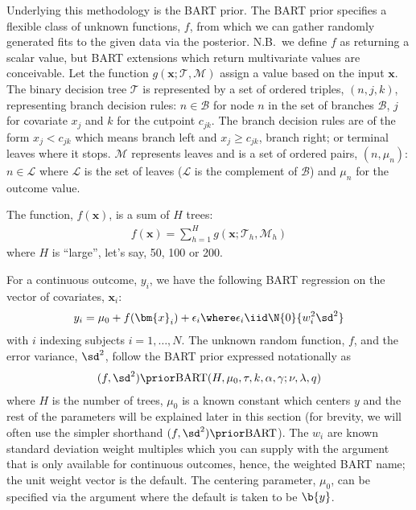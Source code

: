 \documentclass[article]{jss}
\begin{document}

Underlying this methodology is the BART prior.  The BART prior
specifies a flexible class of unknown functions, $f$, from which we
can gather randomly generated fits to the given data via the
posterior.  N.B.\ we define $f$ as returning a scalar value, but BART
extensions which return multivariate values are conceivable.  Let the
function $g(\bm{x}; \mathcal{T}, \mathcal{M})$ assign a value based on
the input $\bm{x}$.  The binary decision tree $\mathcal{T}$ is
represented by a set of ordered triples, $(n, j, k)$, representing
branch decision rules: $n \in \mathcal{B}$ for node $n$ in the set of
branches $\mathcal{B}$, $j$ for covariate $x_j$ and $k$ for the
cutpoint $c_{jk}$.  The branch decision rules are of the form
$x_j< c_{jk}$ which means branch left and $x_j \ge c_{jk}$, branch
right; or terminal leaves where it stops.  $\mathcal{M}$ represents
leaves and is a set of ordered pairs, $(n, \mu_n)$:
$n \in \mathcal{L}$ where $\mathcal{L}$ is the set of leaves
($\mathcal{L}$ is the complement of $\mathcal{B}$) and $\mu_n$ for the
outcome value.

The function, $f(\bm{x})$, is a sum of $H$ trees:
\begin{align}\label{BARTfunction}
f(\bm{x})=\sum_{h=1}^H g(\bm{x}; \mathcal{T}_h, \mathcal{M}_h)
\end{align} 
where $H$ is ``large'', let's say, 50, 100 or 200.

For a continuous outcome, $y_i$, we have the following BART regression
on the vector of covariates, $\bm{x}_i$:
\begin{align*}
y_i=\mu_0+f(\bm{x}_i)+\epsilon_i \where \epsilon_i \iid \N{0}{ w_i^2
  \sd^2}
\end{align*}
with $i$ indexing subjects $i=1, \dots, N$.  The unknown random
function, $f$, and the error variance, $\sd^2$, follow the BART prior
expressed notationally as
\begin{align*}
(f,\sd^2)\prior\mathrm{BART}(H, \mu_{0}, \tau, k, \alpha, \gamma;
\nu, \lambda, q)
\end{align*}
where $H$ is the number of trees, $\mu_0$ is a known constant which
centers ${y}$ and the rest of the parameters will be explained later
in this section (for brevity, we will often use the simpler shorthand
$(f,\sd^2)\prior\mathrm{BART}$).  The $w_i$ are known standard
deviation weight multiples which you can supply with the argument
 that is only available for continuous outcomes, hence, the
weighted BART name; the unit weight vector is the default.  The
centering parameter, $\mu_0$, can be specified via the 
argument where the default is taken to be $\b{y}$.
\end{document}
